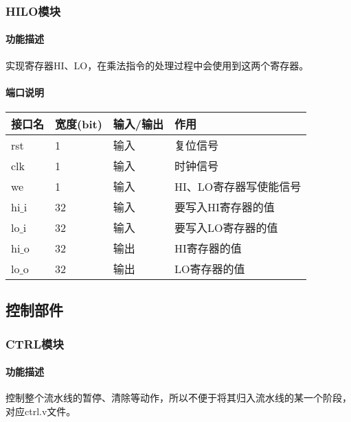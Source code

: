 \subsubsection{HILO模块}
\paragraph{功能描述}
\quad

\quad

实现寄存器HI、LO，在乘法指令的处理过程中会使用到这两个寄存器。
\paragraph{端口说明}
\quad

\quad
	\begin{longtable}{|l|l|l|l|}
		\hline
		接口名 & 宽度(bit) & 输入/输出 & 作用 \\
		\hline
		rst & 1 & 输入 & 复位信号 \\
		\hline
		clk & 1 & 输入 & 时钟信号 \\
		\hline
		we & 1 & 输入 & HI、LO寄存器写使能信号 \\
		\hline
		hi$\_$i & 32 & 输入 & 要写入HI寄存器的值 \\
		\hline
		lo$\_$i & 32 & 输入 & 要写入LO寄存器的值 \\
		\hline
		hi$\_$o & 32 & 输出 & HI寄存器的值 \\
		\hline
		lo$\_$o & 32 & 输出 & LO寄存器的值 \\
		\hline
	\end{longtable}
\subsection{控制部件}
\subsubsection{CTRL模块}
\paragraph{功能描述}
\quad

\quad

控制整个流水线的暂停、清除等动作，所以不便于将其归入流水线的某一个阶段，对应ctrl.v文件。

